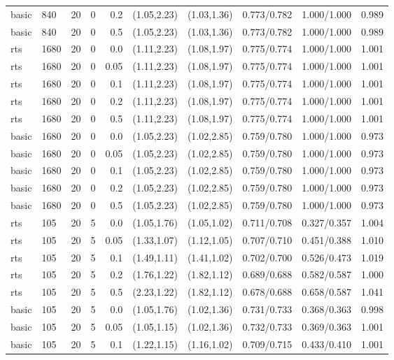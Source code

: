 \begin{tabular}{llrrrccccc}
basic & 840 & 20 & 0 & 0.2 & (1.05,2.23) & (1.03,1.36) & 0.773/0.782 & 1.000/1.000 & 0.989 \\
basic & 840 & 20 & 0 & 0.5 & (1.05,2.23) & (1.03,1.36) & 0.773/0.782 & 1.000/1.000 & 0.989 \\
rts & 1680 & 20 & 0 & 0.0 & (1.11,2.23) & (1.08,1.97) & 0.775/0.774 & 1.000/1.000 & 1.001 \\
rts & 1680 & 20 & 0 & 0.05 & (1.11,2.23) & (1.08,1.97) & 0.775/0.774 & 1.000/1.000 & 1.001 \\
rts & 1680 & 20 & 0 & 0.1 & (1.11,2.23) & (1.08,1.97) & 0.775/0.774 & 1.000/1.000 & 1.001 \\
rts & 1680 & 20 & 0 & 0.2 & (1.11,2.23) & (1.08,1.97) & 0.775/0.774 & 1.000/1.000 & 1.001 \\
rts & 1680 & 20 & 0 & 0.5 & (1.11,2.23) & (1.08,1.97) & 0.775/0.774 & 1.000/1.000 & 1.001 \\
basic & 1680 & 20 & 0 & 0.0 & (1.05,2.23) & (1.02,2.85) & 0.759/0.780 & 1.000/1.000 & 0.973 \\
basic & 1680 & 20 & 0 & 0.05 & (1.05,2.23) & (1.02,2.85) & 0.759/0.780 & 1.000/1.000 & 0.973 \\
basic & 1680 & 20 & 0 & 0.1 & (1.05,2.23) & (1.02,2.85) & 0.759/0.780 & 1.000/1.000 & 0.973 \\
basic & 1680 & 20 & 0 & 0.2 & (1.05,2.23) & (1.02,2.85) & 0.759/0.780 & 1.000/1.000 & 0.973 \\
basic & 1680 & 20 & 0 & 0.5 & (1.05,2.23) & (1.02,2.85) & 0.759/0.780 & 1.000/1.000 & 0.973 \\
rts & 105 & 20 & 5 & 0.0 & (1.05,1.76) & (1.05,1.02) & 0.711/0.708 & 0.327/0.357 & 1.004 \\
rts & 105 & 20 & 5 & 0.05 & (1.33,1.07) & (1.12,1.05) & 0.707/0.710 & 0.451/0.388 & 1.010 \\
rts & 105 & 20 & 5 & 0.1 & (1.49,1.11) & (1.41,1.02) & 0.702/0.700 & 0.526/0.473 & 1.019 \\
rts & 105 & 20 & 5 & 0.2 & (1.76,1.22) & (1.82,1.12) & 0.689/0.688 & 0.582/0.587 & 1.000 \\
rts & 105 & 20 & 5 & 0.5 & (2.23,1.22) & (1.82,1.12) & 0.678/0.688 & 0.658/0.587 & 1.041 \\
basic & 105 & 20 & 5 & 0.0 & (1.05,1.76) & (1.02,1.36) & 0.731/0.733 & 0.368/0.363 & 0.998 \\
basic & 105 & 20 & 5 & 0.05 & (1.05,1.15) & (1.02,1.36) & 0.732/0.733 & 0.369/0.363 & 1.001 \\
basic & 105 & 20 & 5 & 0.1 & (1.22,1.15) & (1.16,1.02) & 0.709/0.715 & 0.433/0.410 & 1.001 \\

\end{tabular}
